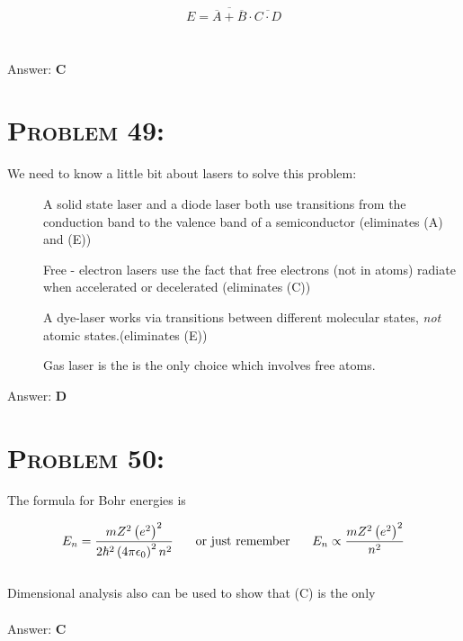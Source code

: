 \documentclass{article}
\begin{document}
\begin{align}
E = \boxed{\overline{\overline{A} + \overline{B}} \cdot \overline{C \cdot D}}\nonumber
\end{align}
\\\\
Answer: \textbf{\textcolor{ProcessBlue}C}\\


\section{\textsc{Problem 49:}} We need to know a little bit about lasers to solve this problem:

\begin{description}

\item[\textbullet] A solid state laser and a diode laser both use transitions from the conduction band to the valence band of a semiconductor (eliminates (A) and (E))

\item[\textbullet] Free - electron lasers use the fact that free electrons (not in atoms) radiate when accelerated or decelerated (eliminates (C))

\item[\textbullet] A dye-laser works via transitions between different molecular states, \textit{not} atomic states.(eliminates (E))

\item[\textbullet] Gas laser is the is the only choice which involves free atoms.

\end{description}

Answer: \textbf{\textcolor{ProcessBlue}D}\\


\section{\textsc{Problem 50:}} The formula for Bohr energies is

\begin{align}
E_{n} = \frac{mZ^{2}\left(e^{2}\right)^{2}}{2 \hbar^{2} \left(4 \pi \epsilon_{0}\right)^{2} n^{2}} \text{\hspace{.2in} or just remember \hspace{.2in}} E_{n} \propto \frac{mZ^{2}\left(e^{2}\right)^{2}}{n^2}
\end{align}
\\
Dimensional analysis also can be used to show that (C) is the only
\\\\
Answer: \textbf{\textcolor{ProcessBlue}C}\\
\end{document}
